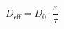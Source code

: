 \documentclass[preview]{standalone}
\begin{document}
\[D_\text{eff} = D_0 \cdot \frac{\varepsilon}{\tau}\]
\end{document}
